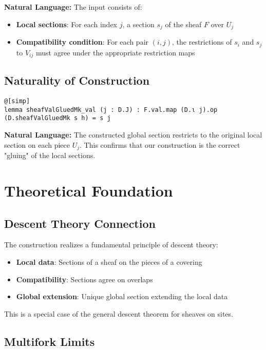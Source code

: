 \documentclass{article}
\theoremstyle{definition}
\begin{document}
\textbf{Natural Language:} The input consists of:
\begin{itemize}
\item \textbf{Local sections}: For each index $j$, a section $s_j$ of the sheaf $F$ over $U_j$
\item \textbf{Compatibility condition}: For each pair $(i,j)$, the restrictions of $s_i$ and $s_j$ to $V_{ij}$ must agree under the appropriate restriction maps
\end{itemize}

\subsection{Naturality of Construction}

\begin{lstlisting}
@[simp]
lemma sheafValGluedMk_val (j : D.J) : F.val.map (D.ι j).op (D.sheafValGluedMk s h) = s j
\end{lstlisting}

\textbf{Natural Language:} The constructed global section restricts to the original local section on each piece $U_j$. This confirms that our construction is the correct "gluing" of the local sections.

\section{Theoretical Foundation}

\subsection{Descent Theory Connection}

The construction realizes a fundamental principle of descent theory:
\begin{itemize}
\item \textbf{Local data}: Sections of a sheaf on the pieces of a covering
\item \textbf{Compatibility}: Sections agree on overlaps  
\item \textbf{Global extension}: Unique global section extending the local data
\end{itemize}

This is a special case of the general descent theorem for sheaves on sites.

\subsection{Multifork Limits}
\end{document}
